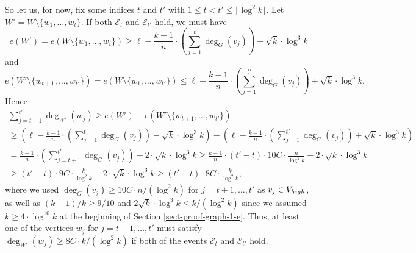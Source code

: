 \documentclass[11pt]{article}
\theoremstyle{definition}
\numberwithin{equation}{section}
\begin{document}
So let us, for now, fix some indices $t$ and $t'$ with $1\leq t<t'\leq \lfloor\log^2 k\rfloor$. Let $W'=W\setminus \lbrace w_1,\dots,w_t\rbrace$. If both $\mathscr{E}_t$ and $\mathscr{E}_{t'}$ hold, we must have
\[e(W')=e(W\setminus \lbrace w_{1},\dots,w_t\rbrace)\geq \ell-\frac{k-1}{n}\cdot\left(\sum_{j=1}^{t}\deg_G(v_j)\right)-\sqrt{k}\cdot \log^3 k\]
and
\[e(W'\setminus \lbrace w_{t+1},\dots,w_{t'}\rbrace)=e(W\setminus \lbrace w_{1},\dots,w_{t'}\rbrace)\leq \ell-\frac{k-1}{n}\cdot\left(\sum_{j=1}^{t'}\deg_G(v_j)\right)+\sqrt{k}\cdot \log^3 k.\]
Hence
\begin{multline*}
\sum_{j=t+1}^{t'}\deg_{W'}(w_j)\geq e(W')-e(W'\setminus \lbrace w_{t+1},\dots,w_{t'}\rbrace)\\
\geq \left(\ell-\frac{k-1}{n}\cdot\left(\sum_{j=1}^{t}\deg_G(v_j)\right)-\sqrt{k}\cdot \log^3 k\right)-\left(\ell-\frac{k-1}{n}\cdot\left(\sum_{j=1}^{t'}\deg_G(v_j)\right)+\sqrt{k}\cdot \log^3 k\right)\\
=\frac{k-1}{n}\cdot\left(\sum_{j=t+1}^{t'}\deg_G(v_j)\right)-2\cdot \sqrt{k}\cdot \log^3 k\geq 
\frac{k-1}{n}\cdot(t'-t)\cdot 10C\cdot \frac{n}{\log^2 k}-2\cdot \sqrt{k}\cdot \log^3 k\\
\geq (t'-t)\cdot 9C\cdot \frac{k}{\log^2 k}-2\cdot \sqrt{k}\cdot \log^3 k
\geq (t'-t)\cdot 8C\cdot \frac{k}{\log^2 k},
\end{multline*}
where we used $\deg_G(v_j)\geq 10C\cdot n/(\log^2 k)$ for $j=t+1,\dots,t'$ as $v_j\in V_{\textnormal{high}}$, as well as $(k-1)/k\geq 9/10$ and $2\sqrt{k}\cdot \log^3 k\leq k/(\log^2 k)$ since we assumed $k\geq 4\cdot \log^{10} k$ at the beginning of Section \ref{sect-proof-graph-1-e}. Thus, at least one of the vertices $w_j$ for $j=t+1,\dots,t'$ must satisfy $\deg_{W'}(w_j)\geq 8C\cdot k/(\log^2 k)$ if both of the events $\mathscr{E}_t$ and $\mathscr{E}_{t'}$ hold.
\end{document}
